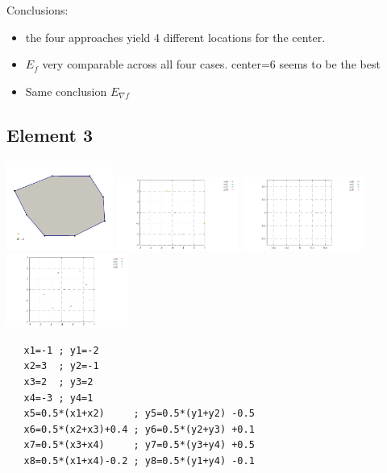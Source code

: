 Conclusions:
\begin{itemize}
\item the four approaches yield 4 different locations for the center.
\item $E_f$ very comparable across all four cases. center=6 seems to be the best
\item Same conclusion $E_{\nabla f}$ 
\end{itemize} 

\newpage
\subsection*{Element 3}
\begin{center}
\includegraphics[width=3.5cm]{images/mappings/biquadratic3/elt3/element3}
\includegraphics[width=4cm]{images/mappings/biquadratic3/elt3/nodes}
\includegraphics[width=4cm]{images/mappings/biquadratic3/elt3/nodes_zoom}
\includegraphics[width=4cm]{images/mappings/biquadratic3/elt3/quad_points}
\end{center}
\begin{lstlisting}
   x1=-1 ; y1=-2
   x2=3  ; y2=-1
   x3=2  ; y3=2
   x4=-3 ; y4=1
   x5=0.5*(x1+x2)     ; y5=0.5*(y1+y2) -0.5
   x6=0.5*(x2+x3)+0.4 ; y6=0.5*(y2+y3) +0.1
   x7=0.5*(x3+x4)     ; y7=0.5*(y3+y4) +0.5
   x8=0.5*(x1+x4)-0.2 ; y8=0.5*(y1+y4) -0.1
\end{lstlisting}

